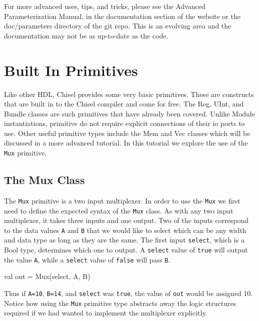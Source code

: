For more advanced uses, tips, and tricks, please see the Advanced Parameterization Manual, in the documentation section of the website or the doc/parameters directory of the git repo. This is an evolving area and the documentation may not be as up-to-date as the code.

\section{Built In Primitives}

Like other HDL, Chisel provides some very basic primitives. These are constructs that are built in to the Chisel compiler and come for free. The Reg, UInt, and Bundle classes are such primitives that have already been covered. Unlike Module instantiations, primitive do not require explicit connections of their io ports to use. Other useful primitive types include the Mem and Vec classes which will be discussed in a more advanced tutorial. In this tutorial we explore the use of the \verb+Mux+ primitive.

\subsection{The Mux Class}

The \verb+Mux+ primitive is a two input multiplexer. In order to use the \verb+Mux+ we first need to define the expected syntax of the \verb+Mux+ class. As with any two input multiplexer, it takes three inputs and one output. Two of the inputs correspond to the data values \verb+A+ and \verb+B+ that we would like to select which can be any width and data type as long as they are the same. The first input \verb+select+, which is a Bool type, determines which one to output.
A \verb+select+ value of \verb+true+ will output the value \verb+A+, while a \verb+select+ value of \verb+false+ will pass \verb+B+.

\begin{scala}
val out = Mux(select, A, B)
\end{scala}

Thus if \verb+A=10+, \verb+B=14+, and \verb+select+ was \verb+true+, the value of \verb+out+ would be assigned 10. Notice how using the \verb+Mux+ primitive type abstracts away the logic structures required if we had wanted to implement the multiplexer explicitly.

\subsection{}

